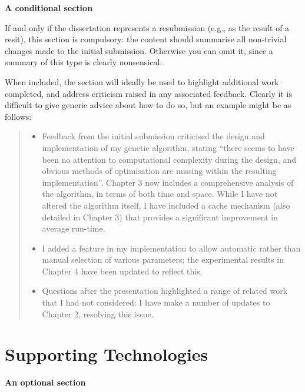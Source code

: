 \documentclass[ oneside,%
                    author={Joshua Felmeden},
                    degree={MEng},
                     title={Semantic Analysis of Financial Headlines Based on Realised Stock Returns},
                  subtitle={}]{dissertation}
\begin{document}
{\bf A conditional section} 
\vspace{1cm} 

If and only if the dissertation represents a resubmission (e.g., as the result of
a resit), this section is compulsory: the content should summarise all
non-trivial changes made to the initial submission.  Otherwise you can
omit it, since a summary of this type is clearly nonsensical.

When included, the section will ideally be used to highlight additional
work completed, and address criticism raised in any associated feedback.
Clearly it is difficult to give generic advice about how to do so, but
an example might be as follows:

\begin{quote}
\noindent
\begin{itemize}
\item Feedback from the initial submission criticised the design and 
      implementation of my genetic algorithm, stating ``there seems 
      to have been no attention to computational complexity during the
      design, and obvious methods of optimisation are missing within
      the resulting implementation''.  Chapter $3$ now includes a
      comprehensive analysis of the algorithm, in terms of both time
      and space.  While I have not altered the algorithm itself, I
      have included a cache mechanism (also detailed in Chapter $3$)
      that provides a significant improvement in average run-time.
\item I added a feature in my implementation to allow automatic rather
      than manual selection of various parameters; the experimental
      results in Chapter $4$ have been updated to reflect this.
\item Questions after the presentation highlighted a range of related
      work that I had not considered: I have make a number of updates 
      to Chapter $2$, resolving this issue.
\end{itemize}
\end{quote}


\chapter*{Supporting Technologies}

{\bf An optional section}
\vspace{1cm} 
\end{document}
